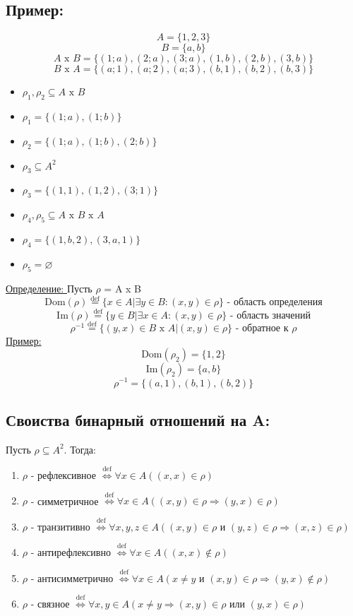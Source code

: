 \documentclass[12pt]{article}
\begin{document}
    \subsection*{Пример:}
    \[A=\{1,2,3\}\]
    \[B=\{a,b\}\]
    \[A \text{ x } B = \{(1;a),(2;a),(3;a),(1,b),(2,b),(3,b)\}\]
    \[B \text{ x } A = \{(a;1),(a;2),(a;3),(b,1),(b,2),(b,3)\}\]
    \begin{itemize}
        \item $\rho_1,\rho_2 \subseteq A \text{ x } B$
        \item $\rho_1 = \{(1;a),(1;b)\}$
        \item $\rho_2 = \{(1;a),(1;b),(2;b)\}$
        \item $\rho_3 \subseteq A^2$
        \item $\rho_3 = \{(1,1),(1,2),(3;1)\}$
        \item $\rho_4,\rho_5 \subseteq A \text{ x } B \text{ x } A$
        \item $\rho_4 = \{(1,b,2),(3,a,1)\}$
        \item $\rho_5 = \varnothing$
    \end{itemize}
    \underline{Определение: } Пусть $\rho$ = A x B
    \[\text{Dom}(\rho)\overset{\text{def}}{=}\{x \in A | \exists y \in B:(x,y) \in \rho\} \text{ - область определения}\]
    \[\text{Im}(\rho)\overset{\text{def}}{=}\{y \in B | \exists x \in A:(x,y)\in \rho\} \text{ - область значений}\]
    \[\rho^{-1}\overset{\text{def}}{=} \{(y,x)\in B \text{ x } A | (x,y)\in \rho\} \text{ - обратное к } \rho\]
    \underline{Пример:} 
    \[\text{Dom}(\rho_2)=\{1,2\}\]
    \[\text{Im}(\rho_2)=\{a,b\}\]
    \[\rho^{-1}=\{(a,1),(b,1),(b,2)\}\]
    \subsection*{Своиства бинарный отношений на A:}
    Пусть $\rho \subseteq A^2$. Тогда:
    \begin{enumerate}
        \item $\rho$ - рефлексивное $\overset{\text{def}}{\Leftrightarrow} \forall x \in A ((x,x)\in \rho)$
        \item $\rho$ - симметричное $\overset{\text{def}}{\Leftrightarrow} \forall x \in A ((x,y)\in \rho \Rightarrow (y,x) \in \rho)$
        \item $\rho$ - транзитивно $\overset{\text{def}}{\Leftrightarrow} \forall x,y,z \in A ((x,y)\in \rho \text{ и } (y,z)\in \rho
        \Rightarrow (x,z) \in \rho)$
        \item $\rho$ - антирефлексивно $\overset{\text{def}}{\Leftrightarrow} \forall x \in A ((x,x) \not \in \rho)$
        \item $\rho$ - антисимметрично $\overset{\text{def}}{\Leftrightarrow} \forall x \in A (x \not = y \text{ и } (x,y) \in \rho
        \Rightarrow (y,x)\not \in \rho)$
        \item $\rho$ - связное $\overset{\text{def}}{\Leftrightarrow}\forall x,y \in A (x \not = y \Rightarrow (x,y)\in \rho \text{ или }
        (y,x)\in \rho)$
    \end{enumerate}
\end{document}
